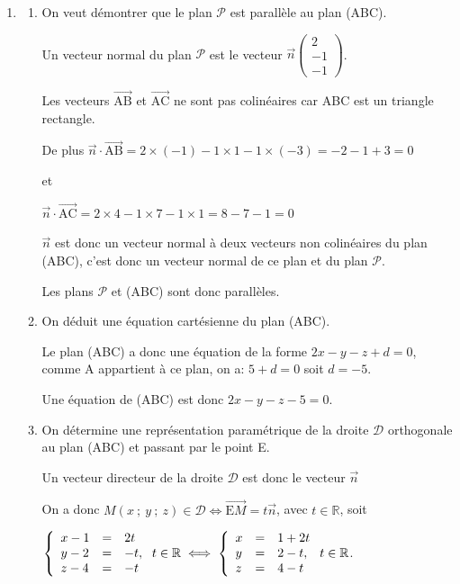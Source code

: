 \documentclass[10pt]{article}
\providecommand{\degres}{\ensuremath{^\circ}}
\providecommand{\R}{\mathbb{R}}
\providecommand{\vect}[1]{\overrightarrow{#1}}
\providecommand{\degres}{{^\circ}}
\begin{document}
\begin{enumerate}
\begin{enumerate}
La calculatrice donne $\widehat{\text{ABC}} \approx 68\degres$ au degré près.
	\end{enumerate}
	
\item
	\begin{enumerate}
		\item On veut démontrer que le plan $\mathcal{P}$ est parallèle au plan (ABC).

Un vecteur normal du plan $\mathscr{P}$ est le vecteur $\vect{n}\begin{pmatrix}2\\-1\\-1\end{pmatrix}$.

Les vecteurs $\vect{\text{AB}}$ et $\vect{\text{AC}}$ ne sont pas colinéaires car ABC est un triangle rectangle.

De plus $\vect{n} \cdot \vect{\text{AB}}=2\times (-1) -1\times 1 - 1\times (-3) =-2-1+3 = 0$

et

$\vect{n} \cdot \vect{\text{AC}}=2\times 4-1\times 7-1\times 1 = 8 - 7 - 1 = 0$

$\vect{n}$ est donc un vecteur normal à deux vecteurs non colinéaires du plan (ABC), c'est donc un vecteur normal de ce plan et du plan $\mathscr{P}$.

Les plans $\mathscr{P}$ et (ABC) sont donc parallèles.

		\item On déduit une équation cartésienne du plan (ABC).

Le plan (ABC) a donc une équation de la forme $2x - y - z + d = 0$, comme A appartient à ce plan,  on a: $5 + d = 0$ soit $d = -5$.
		
Une équation de (ABC) est donc $2x - y - z - 5 = 0$.

		\item On détermine une représentation paramétrique de la droite $\mathcal{D}$ orthogonale au plan (ABC) et passant par le point E.
		
Un vecteur directeur de la droite $\mathcal{D}$ est donc le vecteur $\vect{n}$ 
		

On a donc $M(x~;~y~;~z) \in \mathcal{D} \iff \vect{\text{E}M} = t \vect{n}$, avec $t \in \R$, soit

$\left\{\begin{array}{l c l}
x - 1&=&2t\\
y - 2&=&- t,\\
z - 4&=&-t
\end{array}\right. t \in \R \iff \left\{\begin{array}{l c l}
x &=& 1 +2t\\
y &=& 2 - t,\\
z &=&4 -t
\end{array}\right. t \in \R$.


\end{enumerate}
\end{enumerate}
\end{document}
